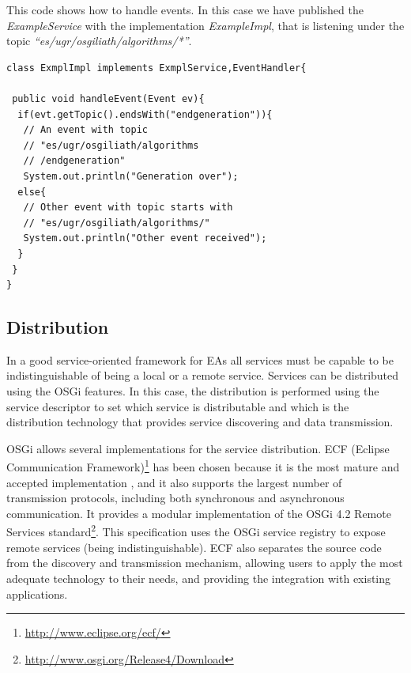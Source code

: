 \documentclass{sig-alternate}
\begin{document}
This code shows how to handle events. In this case we have published the {\em ExampleService} with the implementation {\em ExampleImpl}, that is listening under the topic {\em ``es/ugr/osgiliath/algorithms/*''}.

\begin{lstlisting}
class ExmplImpl implements ExmplService,EventHandler{

 public void handleEvent(Event ev){
  if(evt.getTopic().endsWith("endgeneration")){
   // An event with topic 
   // "es/ugr/osgiliath/algorithms
   // /endgeneration"
   System.out.println("Generation over");
  else{
   // Other event with topic starts with
   // "es/ugr/osgiliath/algorithms/"
   System.out.println("Other event received");
  }
 }
}
\end{lstlisting}


\subsection{Distribution}
In a good service-oriented framework for EAs all services must be capable to be indistinguishable of being a local or a remote service. Services can be distributed using the OSGi features. In this case, the distribution is performed using the service descriptor to set which service is distributable and which is the distribution technology that provides service discovering and data transmission.

OSGi allows several implementations for the service distribution. ECF (Eclipse Communication Framework)\footnote{\url{http://www.eclipse.org/ecf/}} has been chosen because it is the most mature and accepted implementation \cite{petzold2011dynamic}, and it also supports the largest number of transmission protocols, including both synchronous and asynchronous communication. It provides a modular implementation of the OSGi 4.2 Remote Services standard\footnote{\url{http://www.osgi.org/Release4/Download}}. This specification uses the OSGi service registry to expose remote services (being indistinguishable). ECF also separates the source code from the discovery and transmission mechanism, allowing users to apply the most adequate technology to their needs, and providing the integration with existing applications. %
\end{document}
